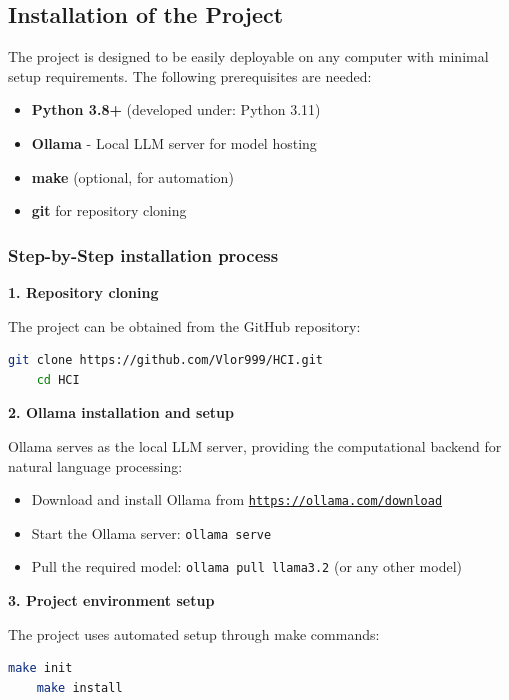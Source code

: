 \subsection{Installation of the Project}

The project is designed to be easily deployable on any computer with minimal setup requirements.
The following prerequisites are needed:

\begin{itemize}
    \item \textbf{Python 3.8+} (developed under: Python 3.11)
    \item \textbf{Ollama} - Local LLM server for model hosting
    \item \textbf{make} (optional, for automation)
    \item \textbf{git} for repository cloning
\end{itemize}

\subsubsection{Step-by-Step installation process}

\textbf{1. Repository cloning}

The project can be obtained from the GitHub repository:

\begin{lstlisting}[language=bash]
    git clone https://github.com/Vlor999/HCI.git
    cd HCI
\end{lstlisting}
\textbf{2. Ollama installation and setup}

Ollama serves as the local LLM server, providing the computational backend for natural language processing:

\begin{itemize}
    \item Download and install Ollama from \href{https://ollama.com/download}{\texttt{https://ollama.com/download}}
    \item Start the Ollama server: \texttt{ollama serve}
    \item Pull the required model: \texttt{ollama pull llama3.2} (or any other model)
\end{itemize}
\textbf{3. Project environment setup}

The project uses automated setup through make commands:

\begin{lstlisting}[language=bash]
    make init
    make install
\end{lstlisting}

